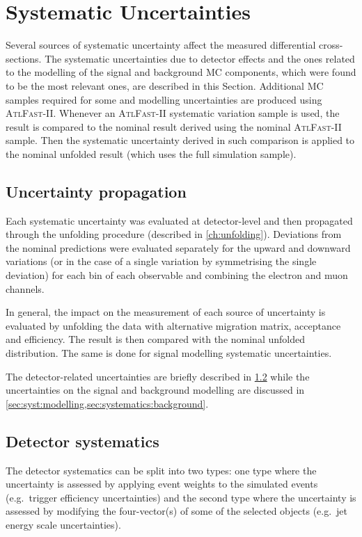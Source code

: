 \section{Systematic Uncertainties}%
\label{ch:systematics}

Several sources of systematic uncertainty affect the measured differential
cross-sections. The systematic uncertainties due to detector effects and the
ones related to the modelling  of the signal and background MC components,
which were found to be the most relevant ones, are described in this Section.
Additional MC samples required for some \ttbar and \tW modelling uncertainties
are produced using \textsc{AtlFast-II}. Whenever an \textsc{AtlFast-II} systematic variation sample is used, 
the result is compared to the nominal result derived using the nominal \textsc{AtlFast-II} sample.
Then the systematic uncertainty derived in such comparison is applied to the nominal unfolded result (which uses the full simulation sample).

\subsection{Uncertainty propagation}%
\label{sec:uncertainty_propagation}
Each systematic uncertainty was evaluated at detector-level and then propagated
through the unfolding  procedure (described in \cref{ch:unfolding}).
Deviations from the nominal predictions were evaluated separately for the
upward and downward variations (or in the case of a single variation by
symmetrising the single deviation) for each bin of each observable and 
combining the electron and muon channels.  

In general, the impact on the measurement of each source of uncertainty
is evaluated by unfolding the data with alternative migration matrix, acceptance
and efficiency. The result is then compared with the nominal unfolded distribution.
The same is done for signal modelling systematic uncertainties.

The detector-related uncertainties are briefly described in \cref{sec:syst:detector}
while the uncertainties on the signal and background modelling are discussed in
\cref{sec:syst:modelling,sec:systematics:background}.

\subsection{Detector systematics}%
\label{sec:syst:detector}
The detector systematics can be split into two types: one type where the uncertainty
is assessed by applying event weights to the simulated events (e.g.\ trigger
efficiency uncertainties) and the second type where the uncertainty is assessed
by modifying the four-vector(s) of some of the selected objects  %
(e.g.\ jet energy scale uncertainties).

